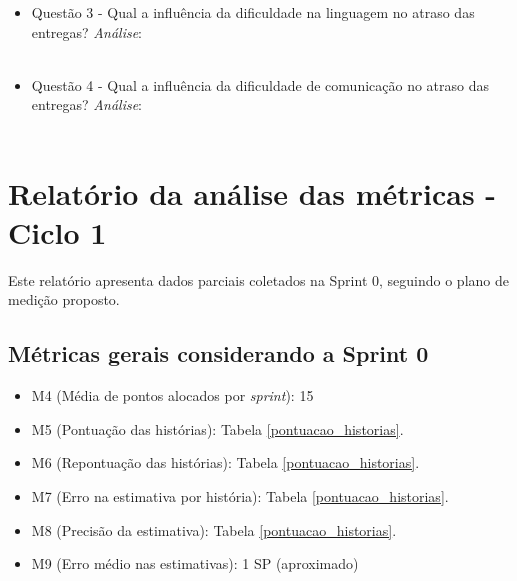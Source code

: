 \begin{apendicesenv}
\begin{itemize}
	  \item Questão 3 - Qual a influência da dificuldade na linguagem no atraso das entregas?
	    \subitem \textit{Análise}:
	  \\
	  \\
	  
	  \item Questão 4 - Qual a influência da dificuldade de comunicação no atraso das entregas?
	    \subitem \textit{Análise}:
	  \\
	  \\
	  
	\end{itemize}
	
  \chapter{Relatório da análise das métricas - Ciclo 1}
  \label{relatorio_1}
      
	Este relatório apresenta dados parciais coletados na Sprint 0, seguindo o plano de medição proposto.
	
	\section{Métricas gerais considerando a Sprint 0}
	
	\begin{itemize}
	 
	  \item M4 (Média de pontos alocados por \textit{sprint}): 15
	  
	  \item M5 (Pontuação das histórias): Tabela \ref{pontuacao_historias}.
	  
	  \item M6 (Repontuação das histórias): Tabela \ref{pontuacao_historias}.
	  
	  \item M7 (Erro na estimativa por história): Tabela \ref{pontuacao_historias}.
	  
	  \item M8 (Precisão da estimativa): Tabela \ref{pontuacao_historias}.
	  
	  \item M9 (Erro médio nas estimativas): 1 SP (aproximado)
	\end{itemize}
	

\end{apendicesenv}
